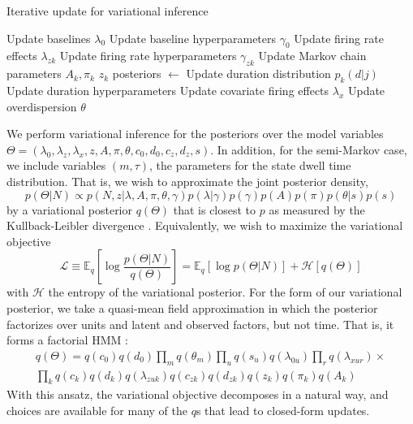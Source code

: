 \documentclass{article} %
\begin{document}
\begin{algorithm}[ht]
\caption{Iterative update for variational inference}\label{algo}
\begin{algorithmic}[1]
    \State Update baselines $\lambda_0$
    \State Update baseline hyperparameters $\gamma_0$
        \State Update firing rate effects $\lambda_{zk}$
        \State Update firing rate hyperparameters $\gamma_{zk}$
        \State Update Markov chain parameters $A_k, \pi_k$
        \State $z_k$ posteriors $\gets$
            \State Update duration distribution $p_k(d|j)$
            \State Update duration hyperparameters
        \EndIf
    \EndFor
    \State Update covariate firing effects $\lambda_x$
    \State Update overdispersion $\theta$
\EndProcedure
\end{algorithmic}
\end{algorithm}

We perform variational inference for the posteriors over the model variables $\Theta = (\lambda_0, \lambda_z, \lambda_x, z, A, \pi, \theta, c_0, d_0, c_z, d_z, s)$. In addition, for the semi-Markov case, we include variables $(m, \tau)$, the parameters for the state dwell time distribution. That is, we wish to approximate the joint posterior density, 
\begin{equation}
    p(\Theta|N) \propto p(N, z|\lambda, A, \pi, \theta, \gamma) 
    p(\lambda|\gamma) p(\gamma)
    p(A)p(\pi)p(\theta|s)p(s)
\end{equation}
by a variational posterior $q(\Theta)$ that is closest to $p$ as measured by the Kullback-Leibler divergence \cite{Wainwright2008-ii}. Equivalently, we wish to maximize the variational objective
\begin{equation}
    \mathcal{L} \equiv \mathbb{E}_q \left[\log \frac{p(\Theta|N)}{q(\Theta)} \right] = \mathbb{E}_q \left[\log p(\Theta|N) \right] + \mathcal{H}[q(\Theta)]
\end{equation}
with $\mathcal{H}$ the entropy of the variational posterior. For the form of our variational posterior, we take a quasi-mean field approximation in which the posterior factorizes over units and latent and observed factors, but not time. That is, it forms a factorial HMM \cite{ghahramani1997factorial}:
\begin{multline}
    q(\Theta) = q(c_0)q(d_0)\prod_m q(\theta_m) \prod_u q(s_u) q(\lambda_{0u}) \prod_r q(\lambda_{xur}) \times \\ 
    \prod_k q(c_k) q(d_k) 
    q(\lambda_{zuk}) q(c_{zk}) q(d_{zk}) q(z_k) q(\pi_k) q(A_k)
\end{multline}
With this ansatz, the variational objective decomposes in a natural way, and choices are available for many of the $q$s that lead to closed-form updates.
\end{document}
